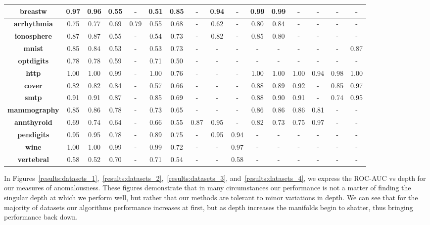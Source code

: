 \begin{small}
\begin{table}[!t]
\begin{tabular}{|c|c|c|c|c|c|c|c|c|c|c|c|c|c|c|c|}
\hline
\bfseries breastw & 0.97 & 0.96 & 0.55 & - & 0.51 & 0.85 & - & 0.94 & - & 0.99 & 0.99 & - & - & - & - \\ 
\hline
\bfseries arrhythmia & 0.75 & 0.77 & 0.69 & 0.79 & 0.55 & 0.68 & - & 0.62 & - & 0.80 & 0.84 & - & - & - & - \\ 
\hline
\bfseries ionosphere & 0.87 & 0.87 & 0.55 & - & 0.54 & 0.73 & - & 0.82 & - & 0.85 & 0.80 & - & - & - & - \\ 
\hline
\bfseries mnist & 0.85 & 0.84 & 0.53 & - & 0.53 & 0.73 & - & - & - & - & - & - & - & - & 0.87 \\ 
\hline
\bfseries optdigits & 0.78 & 0.78 & 0.59 & - & 0.71 & 0.50 & - & - & - & - & - & - & - & - & - \\
\hline
\bfseries http & 1.00 & 1.00 & 0.99 & - & 1.00 & 0.76 & - & - & - & 1.00 & 1.00 & 1.00 & 0.94 & 0.98 & 1.00 \\ 
\hline
\bfseries cover & 0.82 & 0.82 & 0.84 & - & 0.57 & 0.66 & - & - & - & 0.88 & 0.89 & 0.92 & - & 0.85 & 0.97 \\ 
\hline
\bfseries smtp & 0.91 & 0.91 & 0.87 & - & 0.85 & 0.69 & - & - & - & 0.88 & 0.90 & 0.91 & - & 0.74 & 0.95 \\ 
\hline
\bfseries mammography & 0.85 & 0.86 & 0.78 & - & 0.73 & 0.65 & - & - & - & 0.86 & 0.86 & 0.86 & 0.81 & - & - \\ 
\hline
\bfseries annthyroid & 0.69 & 0.74 & 0.64 & - & 0.66 & 0.55 & 0.87 & 0.95 & - & 0.82 & 0.73 & 0.75 & 0.97 & - & - \\ 
\hline
\bfseries pendigits & 0.95 & 0.95 & 0.78 & - & 0.89 & 0.75 & - & 0.95 & 0.94 & - & - & - & - & - & - \\ 
\hline
\bfseries wine & 1.00 & 1.00 & 0.99 & - & 0.99 & 0.72 & - & - & 0.97 & - & - & - & - & - & - \\ 
\hline
\bfseries vertebral & 0.58 & 0.52 & 0.70 & - & 0.71 & 0.54 & - & - & 0.58 & - & - & - & - & - & - \\ 
\hline
\end{tabular}
\end{table}
\end{small}

In Figures~\ref{results:datasets_1},~\ref{results:datasets_2},~\ref{results:datasets_3}, and~\ref{results:datasets_4}, we express the ROC-AUC vs depth for our measures of anomalousness.
These figures demonstrate that in many circumstances our performance is not a matter of finding the singular depth at which we perform well, but rather that our methods are tolerant to minor variations in depth.
We can see that for the majority of datasets our algorithms performance increases at first, but as depth increases the manifolds begin to shatter, thus bringing performance back down.

